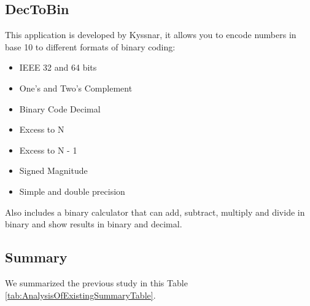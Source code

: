  \subsection{DecToBin }
 This application is developed by Kyssnar, it allows you to encode numbers in base 10 to different formats of binary coding:
 \begin{itemize}
	\item IEEE 32 and 64 bits
	\item One's and Two's Complement
	\item Binary Code Decimal
	\item Excess to N
	\item Excess to N - 1
	\item Signed Magnitude
	\item Simple and double precision
\end{itemize}
 Also includes a binary calculator that can add, subtract, multiply and divide in binary and show results in binary and decimal.\cite{dectobin}
 
 \subsection{Summary }
We summarized the previous study in this Table \ref{tab:AnalysisOfExistingSummaryTable}.

